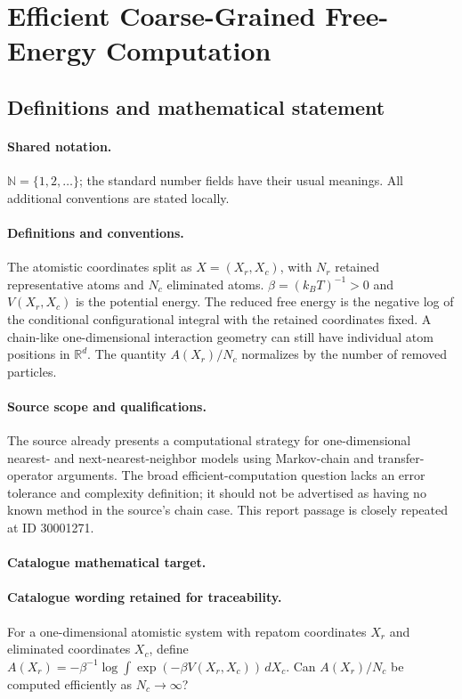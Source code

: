 \documentclass[11pt]{article}
\begin{document}
\section{Efficient Coarse-Grained Free-Energy Computation}\label{statement}

\subsection{Definitions and mathematical statement}

\paragraph{Shared notation.}$\mathbb N=\{1,2,\ldots\}$; the standard number fields have their usual meanings. All additional conventions are stated locally.


\paragraph{Definitions and conventions.} The atomistic coordinates split as $X=(X_r,X_c)$, with $N_r$ retained representative atoms and $N_c$ eliminated atoms. $\beta=(k_BT)^{-1}>0$ and $V(X_r,X_c)$ is the potential energy. The reduced free energy is the negative log of the conditional configurational integral with the retained coordinates fixed. A chain-like one-dimensional interaction geometry can still have individual atom positions in $\mathbb R^d$. The quantity $A(X_r)/N_c$ normalizes by the number of removed particles.

\paragraph{Source scope and qualifications.} The source already presents a computational strategy for one-dimensional nearest- and next-nearest-neighbor models using Markov-chain and transfer-operator arguments. The broad efficient-computation question lacks an error tolerance and complexity definition; it should not be advertised as having no known method in the source's chain case. This report passage is closely repeated at ID 30001271.

\paragraph{Catalogue mathematical target.}
\paragraph{Catalogue wording retained for traceability.}
For a one-dimensional atomistic system with repatom coordinates $X_r$ and eliminated coordinates $X_c$, define $A(X_r)=-\beta^{-1}\log\int\exp(-\beta V(X_r,X_c))\,dX_c$. Can $A(X_r)/N_c$ be computed efficiently as $N_c\to\infty$?
\end{document}
